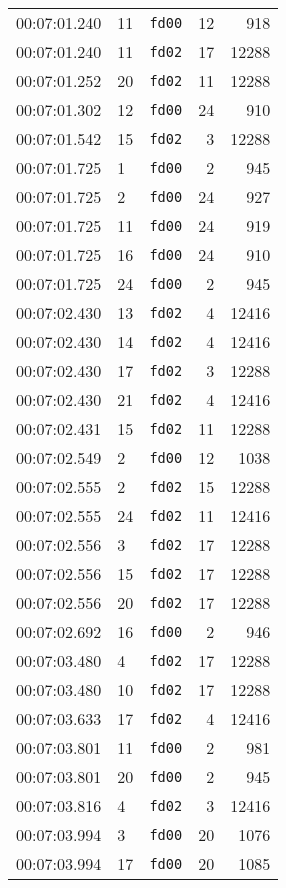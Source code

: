 \documentclass{article}
\begin{document}
\begin{longtable}{lllrr}
00:07:01.240 & 11 & \texttt{fd00} & 12 & 918 \\
00:07:01.240 & 11 & \texttt{fd02} & 17 & 12288 \\
00:07:01.252 & 20 & \texttt{fd02} & 11 & 12288 \\
00:07:01.302 & 12 & \texttt{fd00} & 24 & 910 \\
00:07:01.542 & 15 & \texttt{fd02} & 3 & 12288 \\
00:07:01.725 & 1 & \texttt{fd00} & 2 & 945 \\
00:07:01.725 & 2 & \texttt{fd00} & 24 & 927 \\
00:07:01.725 & 11 & \texttt{fd00} & 24 & 919 \\
00:07:01.725 & 16 & \texttt{fd00} & 24 & 910 \\
00:07:01.725 & 24 & \texttt{fd00} & 2 & 945 \\
00:07:02.430 & 13 & \texttt{fd02} & 4 & 12416 \\
00:07:02.430 & 14 & \texttt{fd02} & 4 & 12416 \\
00:07:02.430 & 17 & \texttt{fd02} & 3 & 12288 \\
00:07:02.430 & 21 & \texttt{fd02} & 4 & 12416 \\
00:07:02.431 & 15 & \texttt{fd02} & 11 & 12288 \\
00:07:02.549 & 2 & \texttt{fd00} & 12 & 1038 \\
00:07:02.555 & 2 & \texttt{fd02} & 15 & 12288 \\
00:07:02.555 & 24 & \texttt{fd02} & 11 & 12416 \\
00:07:02.556 & 3 & \texttt{fd02} & 17 & 12288 \\
00:07:02.556 & 15 & \texttt{fd02} & 17 & 12288 \\
00:07:02.556 & 20 & \texttt{fd02} & 17 & 12288 \\
00:07:02.692 & 16 & \texttt{fd00} & 2 & 946 \\
00:07:03.480 & 4 & \texttt{fd02} & 17 & 12288 \\
00:07:03.480 & 10 & \texttt{fd02} & 17 & 12288 \\
00:07:03.633 & 17 & \texttt{fd02} & 4 & 12416 \\
00:07:03.801 & 11 & \texttt{fd00} & 2 & 981 \\
00:07:03.801 & 20 & \texttt{fd00} & 2 & 945 \\
00:07:03.816 & 4 & \texttt{fd02} & 3 & 12416 \\
00:07:03.994 & 3 & \texttt{fd00} & 20 & 1076 \\
00:07:03.994 & 17 & \texttt{fd00} & 20 & 1085 \\

\end{longtable}
\end{document}
